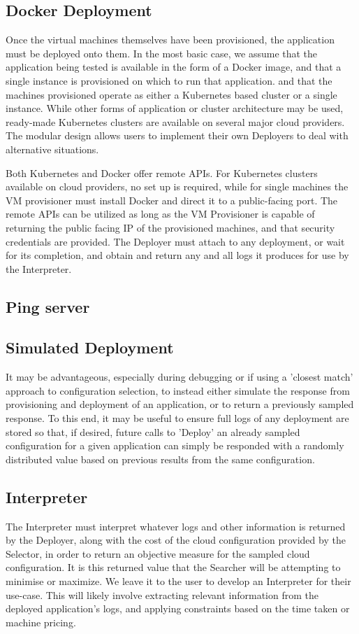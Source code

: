 \documentclass{report}
\begin{document}
\subsection{Docker Deployment}
Once the virtual machines themselves have been provisioned, the application must be deployed onto them. In the most basic case, we assume that the application being tested is available in the form of a Docker image, and that a single instance is provisioned on which to run that application. and that the machines provisioned operate as either a Kubernetes based cluster or a single instance. While other forms of application or cluster architecture may be used, ready-made Kubernetes clusters are available on several major cloud providers. The modular design allows users to implement their own Deployers to deal with alternative situations. 

Both Kubernetes and Docker offer remote APIs. For Kubernetes clusters available on cloud providers, no set up is required, while for single machines the VM provisioner must install Docker and direct it to a public-facing port. The remote APIs can be utilized as long as the VM Provisioner is capable of returning the public facing IP of the provisioned machines, and that security credentials are provided. The Deployer must attach to any deployment, or wait for its completion, and obtain and return any and all logs it produces for use by the Interpreter.

\subsection{Ping server}

\subsection{Simulated Deployment}
It may be advantageous, especially during debugging or if using a 'closest match' approach to configuration selection, to instead either simulate the response from provisioning and deployment of an application, or to return a previously sampled response. To this end, it may be useful to ensure full logs of any deployment are stored so that, if desired, future calls to 'Deploy' an already sampled configuration for a given application can simply be responded with a randomly distributed value based on previous results from the same configuration.

\subsection{Interpreter}
The Interpreter must interpret whatever logs and other information is returned by the Deployer, along with the cost of the cloud configuration provided by the Selector, in order to return an objective measure for the sampled cloud configuration. It is this returned value that the Searcher will be attempting to minimise or maximize. We leave it to the user to develop an Interpreter for their use-case. This will likely involve extracting relevant information from the deployed application's logs, and applying constraints based on the time taken or machine pricing. 
\end{document}
